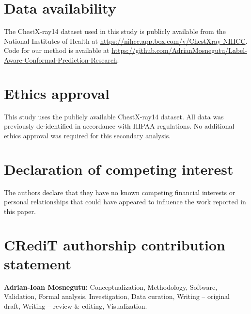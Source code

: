 \section*{Data availability}

The ChestX-ray14 dataset used in this study is publicly available from the National Institutes of Health at \url{https://nihcc.app.box.com/v/ChestXray-NIHCC}. Code for our method is available at \url{https://github.com/AdrianMosnegutu/Label-Aware-Conformal-Prediction-Research}.

\section*{Ethics approval}

This study uses the publicly available ChestX-ray14 dataset. All data was previously de-identified in accordance with HIPAA regulations. No additional ethics approval was required for this secondary analysis.

\section*{Declaration of competing interest}

The authors declare that they have no known competing financial interests or personal relationships that could have appeared to influence the work reported in this paper.

\section*{CRediT authorship contribution statement}

\textbf{Adrian-Ioan Mosnegutu:} Conceptualization, Methodology, Software, Validation, Formal analysis, Investigation, Data curation, Writing -- original draft, Writing -- review \& editing, Visualization.
